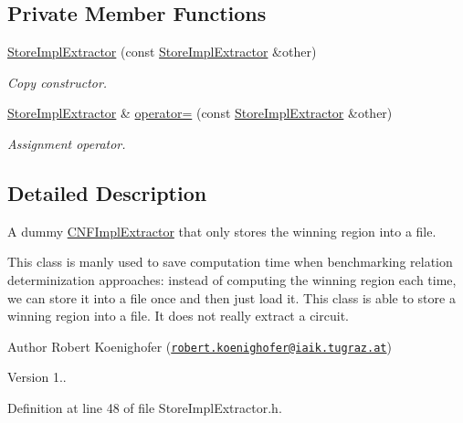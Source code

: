 \subsection*{Private Member Functions}
\begin{DoxyCompactItemize}
\item 
\hyperlink{classStoreImplExtractor_a5389fb6de2bf4e5e813ab2bf4dc23e90}{Store\-Impl\-Extractor} (const \hyperlink{classStoreImplExtractor}{Store\-Impl\-Extractor} \&other)
\begin{DoxyCompactList}\small\item\em Copy constructor. \end{DoxyCompactList}\item 
\hyperlink{classStoreImplExtractor}{Store\-Impl\-Extractor} \& \hyperlink{classStoreImplExtractor_a331227d3a6c7bd37a1bdf79346974166}{operator=} (const \hyperlink{classStoreImplExtractor}{Store\-Impl\-Extractor} \&other)
\begin{DoxyCompactList}\small\item\em Assignment operator. \end{DoxyCompactList}\end{DoxyCompactItemize}


\subsection{Detailed Description}
A dummy \hyperlink{classCNFImplExtractor}{C\-N\-F\-Impl\-Extractor} that only stores the winning region into a file. 

This class is manly used to save computation time when benchmarking relation determinization approaches\-: instead of computing the winning region each time, we can store it into a file once and then just load it. This class is able to store a winning region into a file. It does not really extract a circuit.

\begin{DoxyAuthor}{Author}
Robert Koenighofer (\href{mailto:robert.koenighofer@iaik.tugraz.at}{\tt robert.\-koenighofer@iaik.\-tugraz.\-at}) 
\end{DoxyAuthor}
\begin{DoxyVersion}{Version}
1.. 
\end{DoxyVersion}


Definition at line 48 of file Store\-Impl\-Extractor.\-h.



